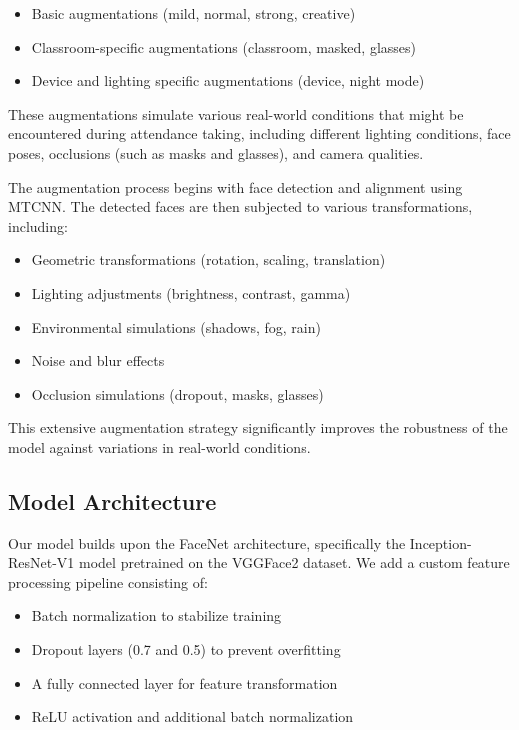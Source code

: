 \documentclass[conference]{IEEEtran}
\begin{document}
\begin{itemize}
\item Basic augmentations (mild, normal, strong, creative)
\item Classroom-specific augmentations (classroom, masked, glasses)
\item Device and lighting specific augmentations (device, night mode)
\end{itemize}

These augmentations simulate various real-world conditions that might be encountered during attendance taking, including different lighting conditions, face poses, occlusions (such as masks and glasses), and camera qualities.

The augmentation process begins with face detection and alignment using MTCNN. The detected faces are then subjected to various transformations, including:

\begin{itemize}
\item Geometric transformations (rotation, scaling, translation)
\item Lighting adjustments (brightness, contrast, gamma)
\item Environmental simulations (shadows, fog, rain)
\item Noise and blur effects
\item Occlusion simulations (dropout, masks, glasses)
\end{itemize}

This extensive augmentation strategy significantly improves the robustness of the model against variations in real-world conditions.

\subsection{Model Architecture}
Our model builds upon the FaceNet architecture, specifically the Inception-ResNet-V1 model pretrained on the VGGFace2 dataset. We add a custom feature processing pipeline consisting of:

\begin{itemize}
\item Batch normalization to stabilize training
\item Dropout layers (0.7 and 0.5) to prevent overfitting
\item A fully connected layer for feature transformation
\item ReLU activation and additional batch normalization
\end{itemize}
\end{document}
